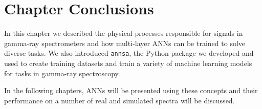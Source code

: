 \section{Chapter Conclusions}

In this chapter we described the physical processes responsible for signals in gamma-ray spectrometers and how multi-layer ANNs can be trained to solve diverse tasks. We also introduced \verb|annsa|, the Python package we developed and used to create training datasets and train a variety of machine learning models for tasks in gamma-ray spectroscopy. 

In the following chapters, ANNs will be presented using these concepts and their performance on a number of real and simulated spectra will be discussed. 

